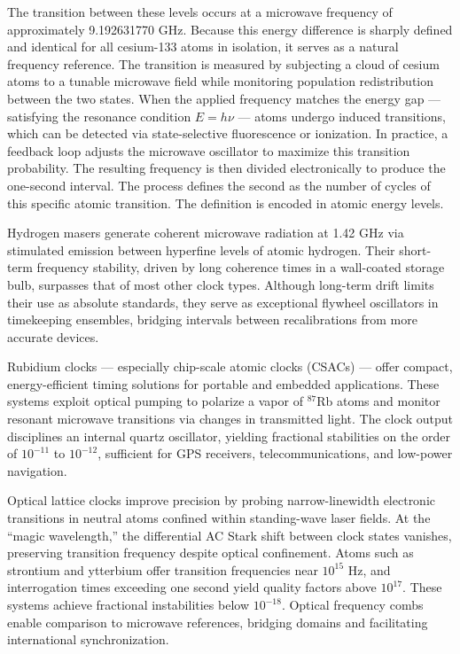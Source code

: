The transition between these levels occurs at a microwave frequency of approximately 9.192631770 GHz. Because this energy difference is sharply defined and identical for all cesium-133 atoms in isolation, it serves as a natural frequency reference. The transition is measured by subjecting a cloud of cesium atoms to a tunable microwave field while monitoring population redistribution between the two states. When the applied frequency matches the energy gap — satisfying the resonance condition $E = h\nu$ — atoms undergo induced transitions, which can be detected via state-selective fluorescence or ionization. In practice, a feedback loop adjusts the microwave oscillator to maximize this transition probability. The resulting frequency is then divided electronically to produce the one-second interval. The process defines the second as the number of cycles of this specific atomic transition. The definition is encoded in atomic energy levels.

Hydrogen masers generate coherent microwave radiation at 1.42 GHz via stimulated emission between hyperfine levels of atomic hydrogen. Their short-term frequency stability, driven by long coherence times in a wall-coated storage bulb, surpasses that of most other clock types. Although long-term drift limits their use as absolute standards, they serve as exceptional flywheel oscillators in timekeeping ensembles, bridging intervals between recalibrations from more accurate devices.

Rubidium clocks — especially chip-scale atomic clocks (CSACs) — offer compact, energy-efficient timing solutions for portable and embedded applications. These systems exploit optical pumping to polarize a vapor of $^{87}$Rb atoms and monitor resonant microwave transitions via changes in transmitted light. The clock output disciplines an internal quartz oscillator, yielding fractional stabilities on the order of $10^{-11}$ to $10^{-12}$, sufficient for GPS receivers, telecommunications, and low-power navigation.

Optical lattice clocks improve precision by probing narrow-linewidth electronic transitions in neutral atoms confined within standing-wave laser fields. At the “magic wavelength,” the differential AC Stark shift between clock states vanishes, preserving transition frequency despite optical confinement. Atoms such as strontium and ytterbium offer transition frequencies near $10^{15}$ Hz, and interrogation times exceeding one second yield quality factors above $10^{17}$. These systems achieve fractional instabilities below $10^{-18}$. Optical frequency combs enable comparison to microwave references, bridging domains and facilitating international synchronization.

